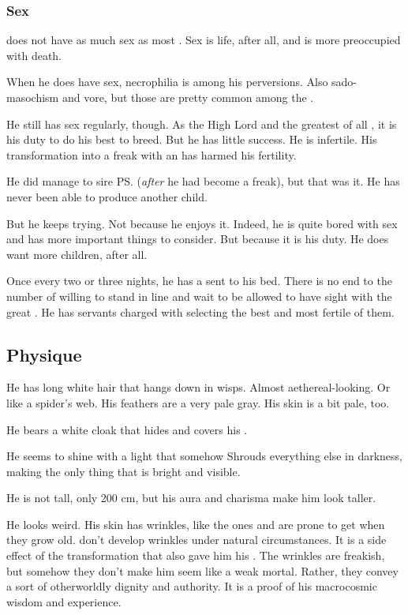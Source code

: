 \subsubsection{Sex}
\Azraid{} does not have as much sex as most \resphain{}. 
Sex is life, after all, and \Azraid{} is more preoccupied with death. 

When he does have sex, necrophilia is among his perversions. 
Also sado-masochism and vore, but those are pretty common among the \resphain.  

He still has sex regularly, though. 
As the High Lord and the greatest of all \resphain, it is his duty to do his best to breed. 
But he has little success. 
He is infertile. 
His transformation into a freak with an  has harmed his fertility. 

He did manage to sire \ps{\Zereth} (\emph{after} he had become a freak), but that was it. 
He has never been able to produce another child. 

But he keeps trying. 
Not because he enjoys it. 
Indeed, he is quite bored with sex and has more important things to consider. 
But because it is his duty. 
He does want more children, after all. 

Once every two or three nights, he has a \resvil{} sent to his bed. 
There is no end to the number of \resviel{} willing to stand in line and wait to be allowed to have sight with the great \Azraid. 
He has servants charged with selecting the best and most fertile of them. 









\subsection{Physique}
He has long white hair that hangs down in wisps. 
Almost aethereal-looking. 
Or like a spider's web. 
His feathers are a very pale gray. 
His skin is a bit pale, too.

He bears a white cloak that hides and covers his . 

He seems to shine with a light that somehow Shrouds everything else in darkness, making \Azraid{} the only thing that is bright and visible. 

He is not tall, only 200 cm, but his aura and charisma make him look taller. 

He looks weird. 
His skin has wrinkles, like the ones \nephilim{} and \humans{} are prone to get when they grow old. 
\Resphain{} don't develop wrinkles under natural circumstances. 
It is a side effect of the transformation that also gave him his . 
The wrinkles are freakish, but somehow they don't make him seem like a weak mortal. 
Rather, they convey a sort of otherworldly dignity and authority. 
It is a proof of his macrocosmic wisdom and experience. 





